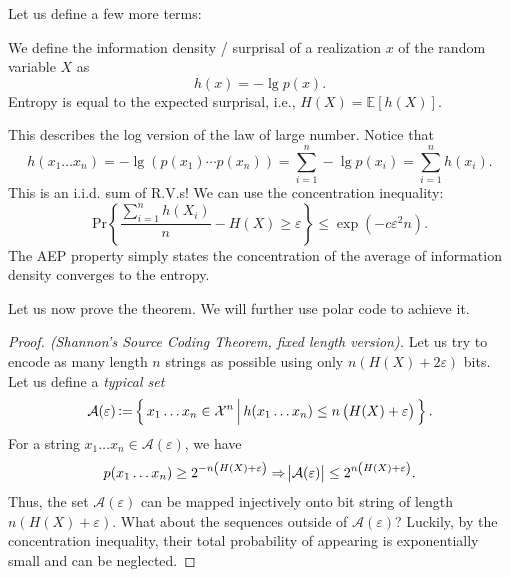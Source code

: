 Let us define a few more terms:
\begin{definition}
    We define the information density / surprisal of a realization $x$ of the random variable $X$ as
    \begin{equation}
        h(x) = -\lg p(x).
    \end{equation}
    Entropy is equal to the expected surprisal, i.e., $H(X) = \mathbb{E}[h(X)]$.
\end{definition}
\begin{definition}
    This describes the log version of the law of large number. Notice that
    \begin{equation}
        h(x_1\ldots x_n) = -\lg\left(p(x_1)\cdots p(x_n)\right) = \sum_{i=1}^n -\lg p(x_i) = \sum_{i=1}^n h(x_i).
    \end{equation}
    This is an i.i.d. sum of R.V.s! We can use the concentration inequality:
    \begin{equation*}
        \mathrm{Pr}\left\{\frac{\sum_{i=1}^n h(X_i)}{n} - H(X) \ge \varepsilon\right\} \le \exp(-c\varepsilon^2n).
    \end{equation*}
    The AEP property simply states the concentration of the average of information density converges to the entropy.
\end{definition}
Let us now prove the theorem. We will further use polar code to achieve it. 
\begin{proof}[Proof. (Shannon's Source Coding Theorem, fixed length version)]
    Let us try to encode as many length $n$ strings as possible using only $n\left(H(X)+2\varepsilon\right)$ bits. Let us define a \textit{typical set}
    \begin{equation}
        \mathcal{A}(\varepsilon) \operatorname{\vcentcolon=} \left\{\,{x_1\ldots x_n \in \mathcal{X}^n}\,\middle\vert\,{h(x_1\ldots x_n) \le n\left(H(X)+\varepsilon\right)}\,\right\}.
    \end{equation}
    For a string $x_1\ldots x_n\in\mathcal{A}(\varepsilon)$, we have
    \begin{equation}
        p(x_1\ldots x_n) \ge 2^{-n\left(H(X)+\varepsilon\right)} \Rightarrow \abs{\mathcal{A}(\varepsilon)} \le 2^{n\left(H(X)+\varepsilon\right)}.
    \end{equation}
    Thus, the set $\mathcal{A}(\varepsilon)$ can be mapped injectively onto bit string of length $n\left(H(X)+\varepsilon\right)$. What about the sequences outside of $\mathcal{A}(\varepsilon)$? Luckily, by the concentration inequality, their total probability of appearing is exponentially small and can be neglected.
\end{proof}
